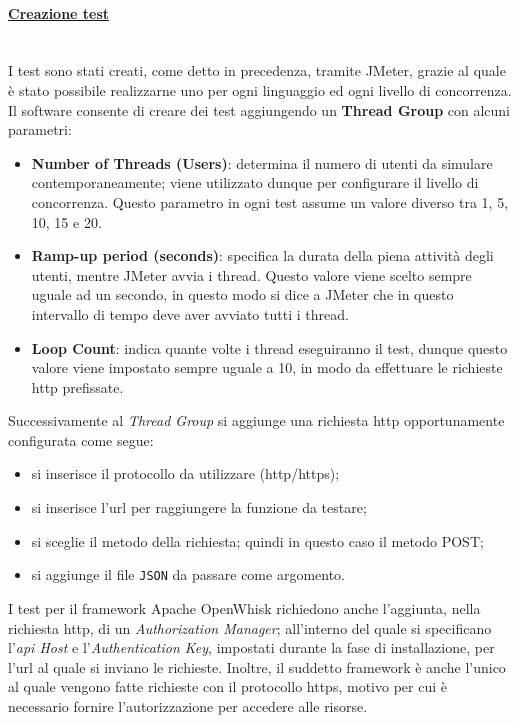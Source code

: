 \documentclass[12pt,a4paper,openany,twoside]{book}
\begin{document}
\paragraph{\underline{Creazione test}} ~\\
I test sono stati creati, come detto in precedenza, tramite JMeter, grazie al quale è stato possibile realizzarne uno per ogni linguaggio ed ogni livello di concorrenza.
Il software consente di creare dei test aggiungendo un \textbf{Thread Group} con alcuni parametri:
\begin{itemize}
    \item \textbf{Number of Threads (Users)}: determina il numero di utenti da simulare contemporaneamente; viene utilizzato dunque per configurare il livello di concorrenza. Questo parametro in ogni test assume un valore diverso tra 1, 5, 10, 15 e 20.
    
    \item \textbf{Ramp-up period (seconds)}: specifica la durata della piena attività degli utenti, mentre JMeter avvia i thread. Questo valore viene scelto sempre uguale ad un secondo, in questo modo si dice a JMeter che in questo intervallo di tempo deve aver avviato tutti i thread.
    
    \item \textbf{Loop Count}: indica quante volte i thread eseguiranno il test, dunque questo valore viene impostato sempre uguale a 10, in modo da effettuare le richieste \ac{http} prefissate.
\end{itemize}
Successivamente al \textit{Thread Group} si aggiunge una richiesta \ac{http} opportunamente configurata come segue:
\begin{itemize}
    \item si inserisce il protocollo da utilizzare (\ac{http}/\ac{https});
    
    \item si inserisce l'\ac{url} per raggiungere la funzione da testare;
    
    \item si sceglie il metodo della richiesta; quindi in questo caso il metodo POST;
    
    \item si aggiunge il file \texttt{JSON} da passare come argomento.
\end{itemize}

\noindent
I test per il framework Apache OpenWhisk richiedono anche l'aggiunta, nella richiesta \ac{http}, di un \textit{Authorization Manager}; all'interno del quale si specificano l'\textit{\ac{api} Host} e l'\textit{Authentication Key}, impostati durante la fase di installazione, per l'\ac{url} al quale si inviano le richieste. Inoltre, il suddetto framework è anche l'unico al quale vengono fatte richieste con il protocollo \ac{https}, motivo per cui è necessario fornire l'autorizzazione per accedere alle risorse.
\end{document}
